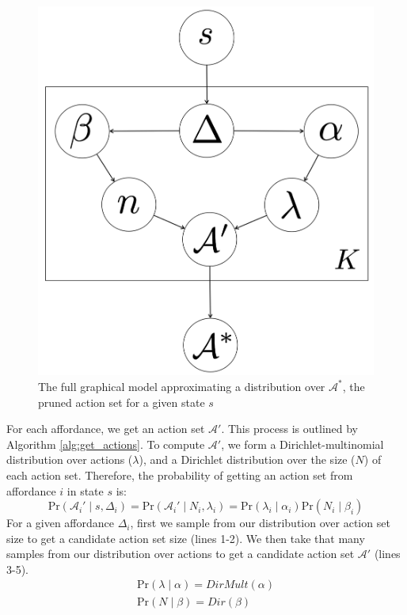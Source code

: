 \documentclass[conference]{IEEEtran}
\begin{document}
\begin{figure}
\centering
\includegraphics[scale=0.14]{figures/learn_graphical_model.png}%
  \caption{The full graphical model approximating a distribution over $\mathcal{A}^*$, the pruned action set for a given state $s$}
  \label{fig:graphical_model}
\end{figure}

For each affordance, we get an action set $\mathcal{A}'$. This 
process is outlined by Algorithm \ref{alg:get_actions}. To compute $\mathcal{A}'$, we form a Dirichlet-multinomial distribution
over actions ($\lambda$), and a Dirichlet distribution over the size ($N$) of each action set. Therefore, the probability of getting an action set from affordance $i$ in state $s$ is:
\begin{equation}
\text{Pr}(\mathcal{A}_i' \mid s,\Delta_i) = \text{Pr}(\mathcal{A}_i' \mid N_i, \lambda_i) = \text{Pr}(\lambda_i \mid \alpha_i) \text{Pr}(N_i \mid \beta_i)
\end{equation}
For a given affordance $\Delta_i$, first we sample from our distribution over action set size to get a candidate action set size (lines 1-2). We then
take that many samples from our distribution over actions to get a candidate action set $\mathcal{A}'$ (lines 3-5).
\begin{align}
\text{Pr}(\lambda \mid \alpha) = DirMult(\alpha) \\
\text{Pr}(N \mid \beta) = Dir(\beta)
\end{align}
\end{document}

